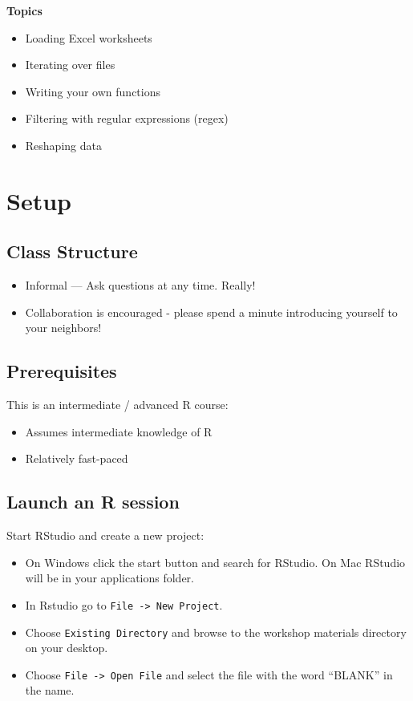 \documentclass[]{book}
\providecommand{\tightlist}{%
  \setlength{\itemsep}{0pt}\setlength{\parskip}{0pt}}
\begin{document}
\textbf{Topics}

\begin{itemize}
\tightlist
\item
  Loading Excel worksheets
\item
  Iterating over files
\item
  Writing your own functions
\item
  Filtering with regular expressions (regex)
\item
  Reshaping data
\end{itemize}

\section{Setup}\label{setup-3}

\subsection{Class Structure}\label{class-structure-3}

\begin{itemize}
\tightlist
\item
  Informal --- Ask questions at any time. Really!
\item
  Collaboration is encouraged - please spend a minute introducing
  yourself to your neighbors!
\end{itemize}

\subsection{Prerequisites}\label{prerequisites-3}

This is an intermediate / advanced R course:

\begin{itemize}
\tightlist
\item
  Assumes intermediate knowledge of R
\item
  Relatively fast-paced
\end{itemize}

\subsection{Launch an R session}\label{launch-an-r-session-2}

Start RStudio and create a new project:

\begin{itemize}
\tightlist
\item
  On Windows click the start button and search for RStudio. On Mac
  RStudio will be in your applications folder.
\item
  In Rstudio go to \texttt{File\ -\textgreater{}\ New\ Project}.
\item
  Choose \texttt{Existing\ Directory} and browse to the workshop
  materials directory on your desktop.
\item
  Choose \texttt{File\ -\textgreater{}\ Open\ File} and select the file
  with the word ``BLANK'' in the name.
\end{itemize}
\end{document}
